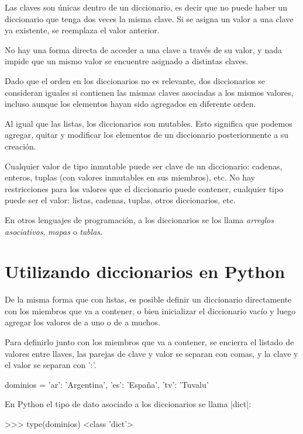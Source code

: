 Las claves son únicas dentro de un diccionario, es decir que no puede haber
un diccionario que tenga dos veces la misma clave. Si se asigna un valor a
una clave ya existente, se reemplaza el valor anterior.

No hay una forma directa de acceder a una clave a través de su valor, y
nada impide que un mismo valor se encuentre asignado a distintas claves.

Dado que el orden en los diccionarios no es relevante, dos diccionarios
se consideran iguales si contienen las mismas claves asociadas a los mismos
valores, incluso aunque los elementos hayan sido agregados en diferente orden.

Al igual que las listas, los diccionarios son mutables. Esto significa que
podemos agregar, quitar y modificar los elementos de un diccionario
posteriormente a su creación.

Cualquier valor de tipo inmutable puede ser clave de un diccionario:
cadenas, enteros, tuplas (con valores inmutables en sus miembros), etc.  No hay
restricciones para los valores que el diccionario puede contener, cualquier
tipo puede ser el valor: listas, cadenas, tuplas, otros diccionarios,
etc.

\begin{sabias_que}
En otros lenguajes de programación, a los diccionarios se los llama \emph{arreglos asociativos},
\emph{mapas} o \emph{tablas}.
\end{sabias_que}

\section{Utilizando diccionarios en Python}

De la misma forma que con listas, es posible definir un diccionario
directamente con los miembros que va a contener, o bien inicializar el
diccionario vacío y luego agregar los valores de a uno o de a muchos.

Para definirlo junto con los miembros que va a contener, se encierra el
listado de valores entre llaves, las parejas de clave y valor se separan
con comas, y la clave y el valor se separan con ':'.

\begin{codigo-python-sn}
dominios = {'ar': 'Argentina', 'es': 'España', 'tv': 'Tuvalu'}
\end{codigo-python-sn}

\begin{observacion}
En Python el tipo de dato asociado a los diccionarios se llama |dict|:

\begin{codigo-python-sn}
>>> type(dominios)
<class 'dict'>
\end{codigo-python-sn}
\end{observacion}

